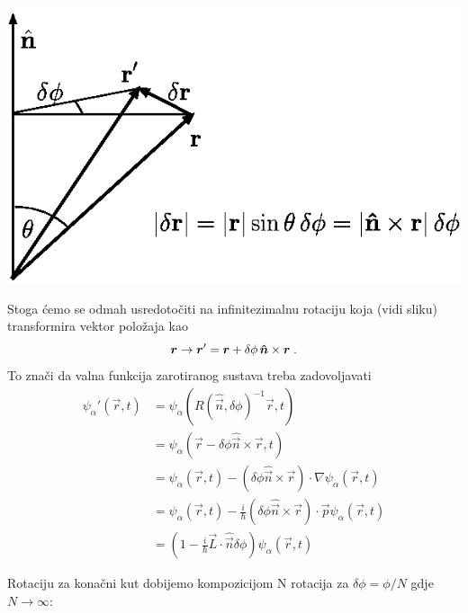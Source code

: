 \centerline{\includegraphics[scale=0.8]{pics/infrotacija.eps}}

Stoga ćemo se odmah usredotočiti na infinitezimalnu rotaciju koja (vidi sliku)
transformira vektor položaja kao
  \begin{equation}
  \vec{r}\to\vec{r}'=\vec{r}+\delta\phi\, \unitn\times\vec{r}  \;.
 \end{equation}
To znači da valna funkcija zarotiranog
sustava treba zadovoljavati
\begin{equation}
\begin{split}
\psi_{\alpha}'(\vec{r}, t)&=\psi_{\alpha}(R(\hat{\vec{n}},\delta \phi)^{-1}
\vec{r}, t) \\
 &=\psi_{\alpha}(\vec{r}-\delta\phi\hat{\vec{n}}\times\vec{r}, t) \\
 &=\psi_{\alpha}(\vec{r}, t)-(\delta\phi\hat{\vec{n}}\times\vec{r})\cdot
  \nabla\psi_{\alpha}(\vec{r}, t) \\
 &= \psi_{\alpha}(\vec{r}, t)-\frac{i}{\hbar}(\delta\phi\hat{\vec{n}}\times
  \vec{r})\cdot \vec{p}\psi_{\alpha}(\vec{r}, t) \\
 &= \left(1-\frac{i}{\hbar}\vec{L}\cdot\hat{\vec{n}}\delta\phi \right)
  \psi_{\alpha}(\vec{r}, t)
\end{split}
\end{equation}

Rotaciju za konačni kut dobijemo kompozicijom N rotacija za $\delta\phi = \phi / N$
gdje $N\to\infty$:

